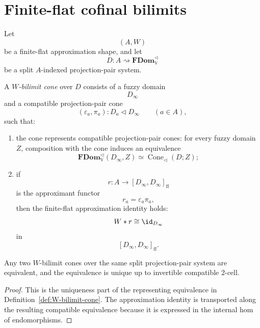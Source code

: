\section{Finite-flat cofinal bilimits}
\label{sec:finite-flat-cofinal-bilimits}

\begin{definition}
\label{def:W-bilimit-cone}
Let
\[
    (A,W)
\]
be a finite-flat approximation shape, and let
\[
    D:A\rightsquigarrow\mathbf{FDom}_{\mathbb V}^{\triangleleft}
\]
be a split \(A\)-indexed projection-pair system.

A \emph{\(W\)-bilimit cone} over \(D\) consists of a fuzzy domain
\[
    D_\infty
\]
and a compatible projection-pair cone
\[
    (\varepsilon_a,\pi_a):D_a\triangleleft D_\infty
    \qquad(a\in A),
\]
such that:

\begin{enumerate}
    \item the cone represents compatible projection-pair cones: for every fuzzy
    domain \(Z\), composition with the cone induces an equivalence
    \[
        \mathbf{FDom}_{\mathbb V}^{\triangleleft}(D_\infty,Z)
        \simeq
        \operatorname{Cone}_{\triangleleft}(D;Z);
    \]

    \item if
    \[
        r:A\to[D_\infty,D_\infty]_{\mathrm{ff}}
    \]
    is the approximant functor
    \[
        r_a=\varepsilon_a\pi_a,
    \]
    then the finite-flat approximation identity holds:
    \[
        W*r
        \cong
        \id_{D_\infty}
    \]
    in
    \[
        [D_\infty,D_\infty]_{\mathrm{ff}}.
    \]
\end{enumerate}
\end{definition}

\begin{lemma}
\label{lem:uniqueness-W-bilimits}
Any two \(W\)-bilimit cones over the same split projection-pair system are
equivalent, and the equivalence is unique up to invertible compatible \(2\)-cell.
\end{lemma}

\begin{proof}
This is the uniqueness part of the representing equivalence in
Definition~\ref{def:W-bilimit-cone}.  The approximation identity is transported
along the resulting compatible equivalence because it is expressed in the
internal hom of endomorphisms.
\end{proof}

